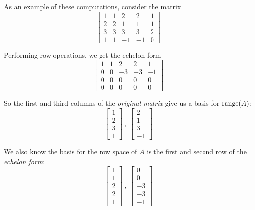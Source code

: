 As an example of these computations, consider the matrix 
$$\begin{bmatrix}
1 & 1 & 2 & 2 & 1 \\
2 & 2 & 1 & 1 & 1 \\
3 & 3 & 3 & 3 & 2 \\
1 & 1 & -1 & -1 & 0
\end{bmatrix}$$

Performing row operations, we get the echelon form 
$$\begin{bmatrix}
1 & 1 & 2 & 2 & 1 \\
0 & 0 & -3 & -3 & -1 \\
0 & 0 & 0 & 0 & 0 \\
0 & 0 & 0 & 0 & 0
\end{bmatrix}$$

So the first and third columns of the \textit{original matrix} give us a basis for $\operatorname{range}(A)$: 
$$\begin{bmatrix}
1 \\ 
2 \\
3 \\ 
1
\end{bmatrix}\ ,\  \begin{bmatrix}
2 \\ 
1 \\
3 \\
-1
\end{bmatrix}$$

We also know the basis for the row space of $A$ is the first and second row of the \textit{echelon form}:
$$\begin{bmatrix}
1 \\
1 \\
2 \\
2 \\
1
\end{bmatrix} \ , \ \begin{bmatrix}
0 \\
0 \\ 
-3 \\ 
-3 \\ 
-1
\end{bmatrix}$$

